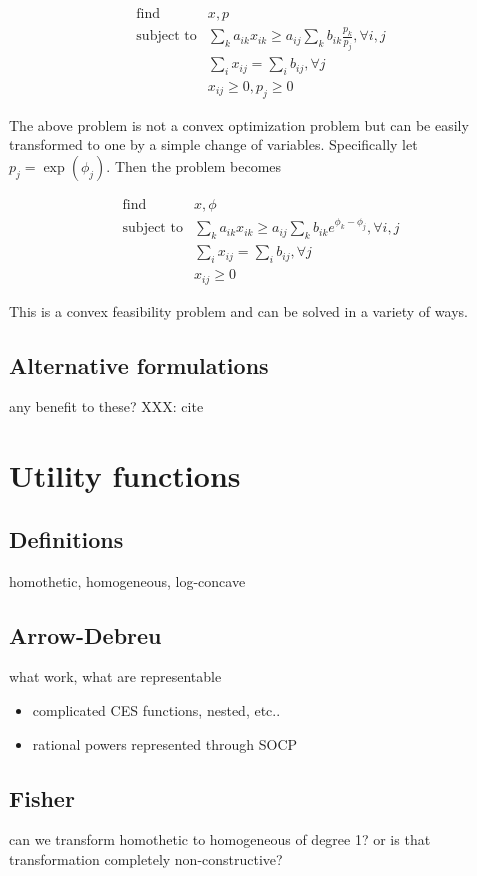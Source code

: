 \documentclass{article}
\begin{document}
\[
\begin{array}{ll}
\mbox{find} & x, p \\
\mbox{subject to} & \sum_k a_{ik} x_{ik} \geq a_{ij} \sum_k b_{ik} \frac{p_k}{p_j}, \forall i,j\\
& \sum_i x_{ij} = \sum_i b_{ij}, \forall j\\
& x_{ij} \geq 0, p_j \geq 0
\end{array}
\]


The above problem is not a convex optimization problem but can be easily transformed to one by a simple change of variables. Specifically let $p_j = \exp(\phi_j)$.
Then the problem becomes

\[
\begin{array}{ll}
\mbox{find} & x, \phi \\
\mbox{subject to} & \sum_k a_{ik} x_{ik} \geq a_{ij} \sum_k b_{ik} e^{\phi_k - \phi_j}, \forall i,j\\
& \sum_i x_{ij} = \sum_i b_{ij}, \forall j\\
& x_{ij} \geq 0
\end{array}
\]

This is a convex feasibility problem and can be solved in a variety of ways.

\subsection{Alternative formulations}
any benefit to these? XXX: cite

\section{Utility functions}
\subsection{Definitions}
homothetic, homogeneous, log-concave


\subsection{Arrow-Debreu}
what work, what are representable
\begin{itemize}
\item complicated CES functions, nested, etc..
\item rational powers represented through SOCP
\end{itemize}
\subsection{Fisher}
can we transform homothetic to homogeneous of degree 1? or is that transformation completely non-constructive?
\end{document}
